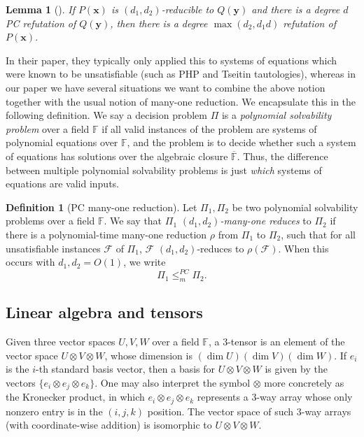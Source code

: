 \documentclass[10pt,a4paper]{article}
\newtheorem{lemma}[theorem]{Lemma}
\theoremstyle{definition}
\newtheorem{definition}[theorem]{Definition}
\newcommand{\F}{\mathbb{F}}
\begin{document}
\begin{lemma}[{\cite[Lem.~1]{DBLP:journals/jcss/BussGIP01}}]
\label{lem:PCred}
If $P(\mathbf{x})$ is $(d_1, d_2)$-reducible to $Q(\mathbf{y})$ and there is
a degree $d$ PC refutation of $Q(\mathbf{y})$, then there is a degree $\max(d_2, d_1 d)$ 
refutation of $P(\mathbf x)$.
\end{lemma}

In their paper, they typically only applied this to systems of equations which were known to be unsatisfiable (such as PHP and Tseitin tautologies), whereas in our paper we have several situations we want to combine the above notion together with the usual notion of many-one reduction. We encapsulate this in the following definition. We say a decision problem $\Pi$ is a \emph{polynomial solvability problem} over a field $\F$ if all valid instances of the problem are systems of polynomial equations over $\F$, and the problem is to decide whether such a system of equations has solutions over the algebraic closure $\overline{\F}$. Thus, the difference between multiple polynomial solvability problems is just \emph{which} systems of equations are valid inputs.

\begin{definition}[PC many-one reduction] \label{def:reduction2}
Let $\Pi_1, \Pi_2$ be two polynomial solvability problems over a field $\F$. We say that $\Pi_1$ \emph{$(d_1,d_2)$-many-one reduces} to $\Pi_2$ if there is a polynomial-time many-one reduction $\rho$ from $\Pi_1$ to $\Pi_2$, such that for all unsatisfiable instances $\mathcal{F}$ of $\Pi_1$, $\mathcal{F}$ $(d_1, d_2)$-reduces to $\rho(\mathcal{F})$. When this occurs with $d_1,d_2 = O(1)$, we write \[\Pi_1 \leq_m^{PC} \Pi_2.\]
\end{definition}



\subsection{Linear algebra and tensors}
Given three vector spaces $U,V,W$ over a field $\F$, a 3-tensor is an element of the vector space $U \otimes V \otimes W$, whose dimension is $(\dim U)(\dim V)(\dim W)$. If $e_i$ is the $i$-th standard basis vector, then a basis for $U \otimes V \otimes W$ is given by the vectors $\{e_i \otimes e_j \otimes e_k\}$. One may also interpret the symbol $\otimes$ more concretely as the Kronecker product, in which $e_i \otimes e_j \otimes e_k$ represents a 3-way array whose only nonzero entry is in the $(i,j,k)$ position. The vector space of such 3-way arrays (with coordinate-wise addition) is isomorphic to $U \otimes V \otimes W$.
\end{document}
